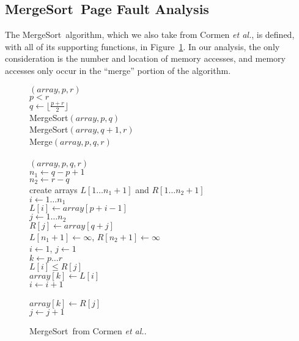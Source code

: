 \documentclass[11pt]{article}
\newcommand{\mergesort}{{\sc MergeSort}}
\begin{document}
\subsection{\mergesort\ Page Fault Analysis}
The \mergesort\ algorithm, which we also
take from Cormen {\it et al.}\cite{clrs}, is defined, with all of its
supporting functions, in Figure~\ref{fig:msort}.  In our analysis, the only consideration is the number and location of memory accesses, and memory accesses only occur in the ``merge'' portion of the algorithm.

\begin{figure}
\begin{algorithm}
$(array, p, r)$\+\\
    \If $p < r$\+\\
        $q \gets \lfloor\frac{p+r}{2}\rfloor$\\
        MergeSort$(array, p, q)$\\
        MergeSort$(array, q+1, r)$\\
        Merge$(array, p, q, r)$\-\-\\
\\
$(array, p, q, r)$\+\\
    $n_1 \gets q - p + 1$\\
    $n_2 \gets r - q$\\
    create arrays $L[1\ldots n_1+1]$ and $R[1\ldots n_2+1]$\\
    \For $i \gets 1 \ldots n_1$\+\\
        $L[i] \gets array[p+i-1]$\-\\
    \For $j \gets 1 \ldots n_2$\+\\
        $R[j] \gets array[q+j]$\-\\
    $L[n_1+1] \gets \infty$, $R[n_2+1] \gets \infty$\\
    $i \gets 1$, $j \gets 1$\\
    \For $k \gets p \ldots r$\+\\
        \If $L[i] \le R[j]$\+\\
            $array[k] \gets L[i]$\\
            $i \gets i+1$\-\\
        \Else\+\\
            $array[k] \gets R[j]$\\
            $j \gets j+1$
\end{algorithm}

\caption{\mergesort\ from Cormen {\it et al.}\cite{clrs}.}
\label{fig:msort}
\end{figure}
\end{document}
